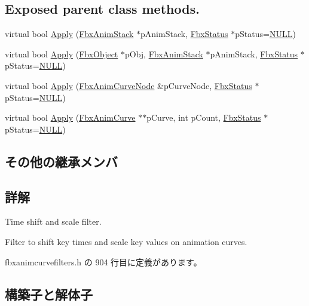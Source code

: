 \subsection*{Exposed parent class methods.}
\begin{DoxyCompactItemize}
\item 
virtual bool \hyperlink{class_fbx_anim_curve_filter_t_s_s_a7c301b85f939c3614d998f18e7a20f21}{Apply} (\hyperlink{class_fbx_anim_stack}{Fbx\+Anim\+Stack} $\ast$p\+Anim\+Stack, \hyperlink{class_fbx_status}{Fbx\+Status} $\ast$p\+Status=\hyperlink{fbxarch_8h_a070d2ce7b6bb7e5c05602aa8c308d0c4}{N\+U\+LL})
\item 
virtual bool \hyperlink{class_fbx_anim_curve_filter_t_s_s_af45ca048d4dbffe6d12cbc42f6e26c10}{Apply} (\hyperlink{class_fbx_object}{Fbx\+Object} $\ast$p\+Obj, \hyperlink{class_fbx_anim_stack}{Fbx\+Anim\+Stack} $\ast$p\+Anim\+Stack, \hyperlink{class_fbx_status}{Fbx\+Status} $\ast$p\+Status=\hyperlink{fbxarch_8h_a070d2ce7b6bb7e5c05602aa8c308d0c4}{N\+U\+LL})
\item 
virtual bool \hyperlink{class_fbx_anim_curve_filter_t_s_s_a9d6e08d720db38d5d795c3993298ada2}{Apply} (\hyperlink{class_fbx_anim_curve_node}{Fbx\+Anim\+Curve\+Node} \&p\+Curve\+Node, \hyperlink{class_fbx_status}{Fbx\+Status} $\ast$p\+Status=\hyperlink{fbxarch_8h_a070d2ce7b6bb7e5c05602aa8c308d0c4}{N\+U\+LL})
\item 
virtual bool \hyperlink{class_fbx_anim_curve_filter_t_s_s_a437251b0d7ead091c273ae49a3e21e5f}{Apply} (\hyperlink{class_fbx_anim_curve}{Fbx\+Anim\+Curve} $\ast$$\ast$p\+Curve, int p\+Count, \hyperlink{class_fbx_status}{Fbx\+Status} $\ast$p\+Status=\hyperlink{fbxarch_8h_a070d2ce7b6bb7e5c05602aa8c308d0c4}{N\+U\+LL})
\end{DoxyCompactItemize}
\subsection*{その他の継承メンバ}


\subsection{詳解}
Time shift and scale filter.

Filter to shift key times and scale key values on animation curves. 

 fbxanimcurvefilters.\+h の 904 行目に定義があります。



\subsection{構築子と解体子}
\mbox{\label{class_fbx_anim_curve_filter_t_s_s_a31c1875bfeb94aec880e46c449853409}} 
